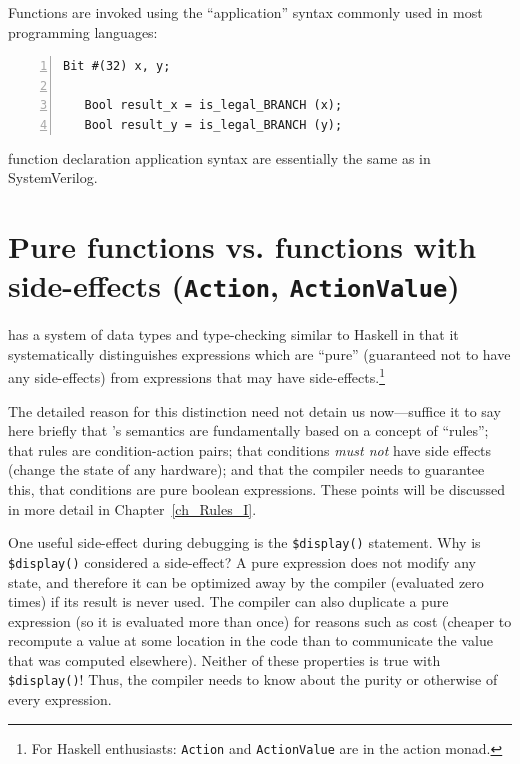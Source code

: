 Functions are invoked using the ``application'' syntax commonly used
in most programming languages:

{\footnotesize
\begin{Verbatim}[frame=single, numbers=left]
   Bit #(32) x, y;

   Bool result_x = is_legal_BRANCH (x);
   Bool result_y = is_legal_BRANCH (y);
\end{Verbatim}
}

{\BSV} function declaration application syntax are essentially the
same as in SystemVerilog.





\section{Pure functions vs. functions with side-effects ({\tt Action}, {\tt ActionValue})}

\label{Sec_Pure_vs_Side_Effect_functions}


{\BSV} has a system of data types and type-checking similar to Haskell
in that it systematically distinguishes expressions which are ``pure''
(guaranteed not to have any side-effects) from expressions that may
have side-effects.\footnote{For Haskell enthusiasts: {\tt Action} and
{\tt ActionValue} are in the action monad.}

The detailed reason for this distinction need not detain us
now---suffice it to say here briefly that {\BSV}'s semantics are
fundamentally based on a concept of ``rules''; that rules are
condition-action pairs; that conditions \emph{must not} have side
effects (change the state of any hardware); and that the compiler
needs to guarantee this, {\ie} that conditions are pure boolean
expressions.  These points will be discussed in more detail in
Chapter~\ref{ch_Rules_I}.

One useful side-effect during debugging is the {\tt \$display()}
statement.  Why is {\tt \$display()} considered a side-effect?  A pure
expression does not modify any state, and therefore it can be
optimized away by the compiler (evaluated zero times) if its result is
never used.  The compiler can also duplicate a pure expression (so it
is evaluated more than once) for reasons such as cost (cheaper to
recompute a value at some location in the code than to communicate the
value that was computed elsewhere).  Neither of these properties is
true with {\tt \$display()}!  Thus, the compiler needs to know about
the purity or otherwise of every expression.

